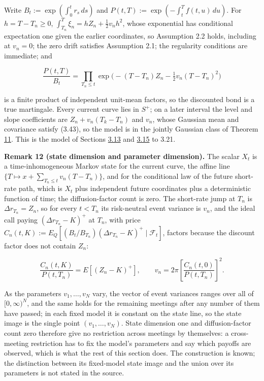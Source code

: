 \documentclass[11pt]{article}
\begin{document}
Write \(B_t := \exp(\int_0^t r_s\,ds)\) and \(P(t, T) := \exp(-\int_t^T f(t, u)\,du)\). For \(h = T - T_n \ge 0\), \(\int_{T_n}^T \xi_n = h Z_n + \tfrac12 v_n h^2\), whose exponential has conditional expectation one given the earlier coordinates, so Assumption 2.2 holds, including at \(v_n = 0\); the zero drift satisfies Assumption 2.1; the regularity conditions are immediate; and

\begin{equation*}
\frac{P(t, T)}{B_t} = \prod_{T_n \le t} \exp\bigl( -(T - T_n) Z_n - \tfrac12 v_n (T - T_n)^2 \bigr) \tag{3.47}\label{eq:3.47}
\end{equation*}

is a finite product of independent unit-mean factors, so the discounted bond is a true martingale. Every current curve lies in \(S^+\); on a later interval the level and slope coefficients are \(Z_n + v_n(T_k - T_n)\) and \(v_n\), whose Gaussian mean and covariance satisfy (3.43), so the model is in the jointly Gaussian class of Theorem \hyperref[res:Theorem-11]{11}. This is the model of Sections \hyperref[sec:3.13]{3.13} and \hyperref[sec:3.15]{3.15} to 3.21.

\textbf{Remark 12 (state dimension and parameter dimension).} The scalar \(X_t\) is a time-inhomogeneous Markov state for the current curve, the affine line \(\{T \mapsto x + \sum_{T_n \le t} v_n (T - T_n)\}\), and for the conditional law of the future short-rate path, which is \(X_t\) plus independent future coordinates plus a deterministic function of time; the diffusion-factor count is zero. The short-rate jump at \(T_n\) is \(\Delta r_{T_n} = Z_n\), so for every \(t < T_n\) its risk-neutral event variance is \(v_n\), and the ideal call paying \((\Delta r_{T_n} - K)^+\) at \(T_n\), with price \(C_n(t, K) := E_Q[(B_t / B_{T_n})(\Delta r_{T_n} - K)^+ \mid \mathcal F_t]\), factors because the discount factor does not contain \(Z_n\):

\begin{equation*}
\frac{C_n(t, K)}{P(t, T_n)} = E[(Z_n - K)^+], \qquad v_n = 2\pi \left[ \frac{C_n(t, 0)}{P(t, T_n)} \right]^2. \tag{3.48}\label{eq:3.48}
\end{equation*}

As the parameters \(v_1, \dots, v_N\) vary, the vector of event variances ranges over all of \([0, \infty)^N\), and the same holds for the remaining meetings after any number of them have passed; in each fixed model it is constant on the state line, so the state image is the single point \((v_1, \dots, v_N)\). State dimension one and diffusion-factor count zero therefore give no restriction across meetings by themselves: a cross-meeting restriction has to fix the model's parameters and say which payoffs are observed, which is what the rest of this section does. The construction is known; the distinction between its fixed-model state image and the union over its parameters is not stated in the source.
\end{document}
